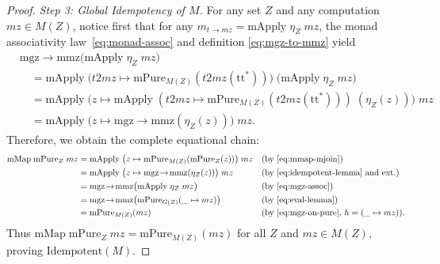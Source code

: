 \documentclass[11pt,a4paper]{article}
\theoremstyle{definition}
\theoremstyle{remark}
\newcommand{\ttstar}{\mathrm{tt}^*}
\begin{document}
\begin{proof}
\emph{Step 3: Global Idempotency of $M$.}
For any set $Z$ and any computation $mz \in M(Z)$, notice first that for any $m_{t\to mz} =
\mathrm{mApply}\;\eta_Z\;mz$, the monad associativity law~\eqref{eq:monad-assoc} and definition
\eqref{eq:mgz-to-mmz} yield
\begin{align}
  &\mathrm{mgz\!\to\!mmz}\bigl(\mathrm{mApply}\;\eta_Z\;mz\bigr) \nonumber \\
  &\quad= \mathrm{mApply}\;\bigl(t2mz \mapsto \mathrm{mPure}_{M(Z)}(t2mz(\ttstar))\bigr)\;\bigl(\mathrm{mApply}\;\eta_Z\;mz\bigr) \nonumber \\
  &\quad= \mathrm{mApply}\;\bigl(z \mapsto \mathrm{mApply}\;(t2mz \mapsto \mathrm{mPure}_{M(Z)}(t2mz(\ttstar)))\;(\eta_Z(z))\bigr)\;mz \nonumber \\
  &\quad= \mathrm{mApply}\;\bigl(z \mapsto \mathrm{mgz\!\to\!mmz}(\eta_Z(z))\bigr)\;mz. \label{eq:mgz-assoc}
\end{align}
Therefore, we obtain the complete equational chain:
\begin{align*}
  \mathrm{mMap}\;\mathrm{mPure}_Z\;mz
  &= \mathrm{mApply}\;\bigl(z \mapsto \mathrm{mPure}_{M(Z)}(\mathrm{mPure}_Z(z))\bigr)\;mz
    &&\text{(by \eqref{eq:mmap-mjoin})} \\
  &= \mathrm{mApply}\;\bigl(z \mapsto \mathrm{mgz\!\to\!mmz}(\eta_Z(z))\bigr)\;mz
    &&\text{(by \eqref{eq:idempotent-lemma} and ext.)} \\
  &= \mathrm{mgz\!\to\!mmz}\bigl(\mathrm{mApply}\;\eta_Z\;mz\bigr)
    &&\text{(by \eqref{eq:mgz-assoc})} \\
  &= \mathrm{mgz\!\to\!mmz}\bigl(\mathrm{mPure}_{G(Z)}(\_ \mapsto mz)\bigr)
    &&\text{(by \eqref{eq:eval-lemma})} \\
  &= \mathrm{mPure}_{M(Z)}(mz)
    &&\text{(by \eqref{eq:mgz-on-pure}, $h = (\_ \mapsto mz)$)}.
\end{align*}
Thus $\mathrm{mMap}\;\mathrm{mPure}_Z\;mz = \mathrm{mPure}_{M(Z)}(mz)$ for all $Z$ and $mz \in M(Z)$,
proving $\mathrm{Idempotent}(M)$.


\end{proof}
\end{document}
